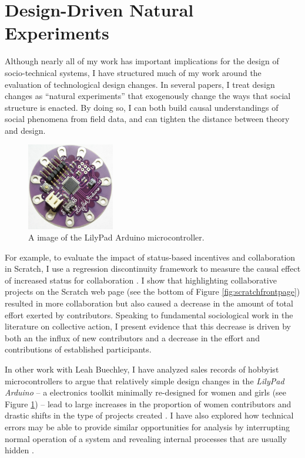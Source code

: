 \documentclass[10pt]{memoir}
\begin{document}
\section{Design-Driven Natural Experiments}

Although nearly all of my work has important implications for the
design of socio-technical systems, I have structured much of my work
around the evaluation of technological design changes. In several
papers, I treat design changes as ``natural experiments'' that
exogenously change the ways that social structure is enacted. By doing
so, I can both build causal understandings of social phenomena from
field data, and can tighten the distance between theory and design.

\begin{figure}
 \vspace{-1em}
 \begin{centering}
 \includegraphics[width=1.5in]{figures/lilypad.png}
 \caption{A image of the LilyPad Arduino microcontroller.}
 \label{fig:lilypad}
 \end{centering}
 \vspace{-1em}
\end{figure}

For example, to evaluate the impact of status-based incentives and
collaboration in Scratch, I use a regression discontinuity framework
to measure the causal effect of increased status for collaboration
\cite{hill_causal_2012}. I show that highlighting collaborative
projects on the Scratch web page (see the bottom of Figure
\ref{fig:scratchfrontpage}) resulted in more collaboration but also
caused a decrease in the amount of total effort exerted by
contributors. Speaking to fundamental sociological work in the
literature on collective action, I present evidence that this decrease
is driven by both an the influx of new contributors and a decrease in
the effort and contributions of established participants.

In other work with Leah Buechley, I have analyzed sales records of
hobbyist microcontrollers to argue that relatively simple design
changes in the \emph{LilyPad Arduino} -- a electronics toolkit
minimally re-designed for women and girls (see Figure
\ref{fig:lilypad}) -- lead to large increases in the proportion of
women contributors and drastic shifts in the type of projects created
\cite{buechley_lilypad_2010}. I have also explored how technical
errors may be able to provide similar opportunities for analysis by
interrupting normal operation of a system and revealing internal
processes that are usually hidden \cite{hill_revealing_2010}.
\end{document}
